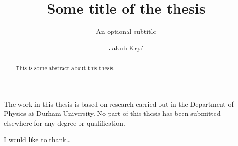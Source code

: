 \documentclass[twoside,frontopenright,halfspacing, openany]{ip3thesis}
\begin{document}
\title{Some title of the thesis}
\subtitle{An optional subtitle}
\author{Jakub Kryś}
\maketitlepage*

\begin{abstract}
%
	This is some abstract about this thesis.
%
\end{abstract}

\disableprotrusion
\tableofcontents*
\enableprotrusion

\begin{declaration*}
%
	The work in this thesis is based on research carried out in the Department of
	Physics at Durham University. No part of this thesis has been
	submitted elsewhere for any degree or qualification.
%
\end{declaration*}

\begin{acknowledgements*}
%
	I would like to thank\ldots
%
\end{acknowledgements*}











\appendix

%
%
%



\end{document}
